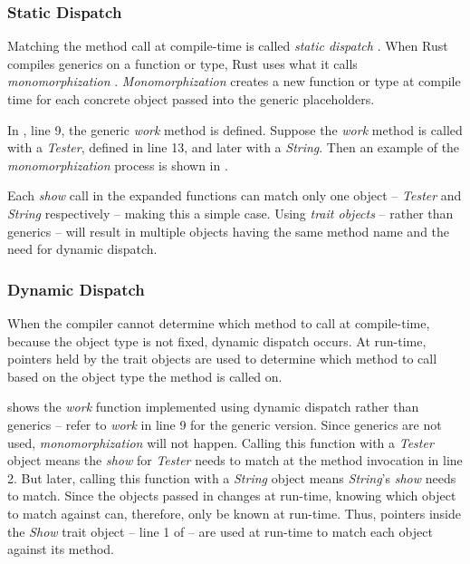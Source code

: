 \subsubsection{Static Dispatch}
Matching the method call at compile-time is called \textit{static dispatch} \cite{klabnik_2019_01, alexandrescu_01_01, abadi_12_01}.
When Rust compiles generics on a function or type, Rust uses what it calls \textit{monomorphization} \cite{klabnik_2019_01}.
\textit{Monomorphization} creates a new function or type at compile time for each concrete object passed into the generic placeholders.

In , line 9, the generic \textit{work} method is defined.
Suppose the \textit{work} method is called with a \textit{Tester}, defined in line 13, and later with a \textit{String}.
Then an example of the \textit{monomorphization} process is shown in .


Each \textit{show} call in the expanded functions can match only one object -- \textit{Tester} and \textit{String} respectively -- making this a simple case.
Using \textit{trait objects} -- rather than generics -- will result in multiple objects having the same method name and the need for dynamic dispatch.

\subsubsection{Dynamic Dispatch}
When the compiler cannot determine which method to call at compile-time, because the object type is not fixed, dynamic dispatch \cite{alexandrescu_01_01, klabnik_2019_01, abadi_12_01} occurs.
At run-time, pointers held by the trait objects are used to determine which method to call \cite{klabnik_2019_01} based on the object type the method is called on.

 shows the \textit{work} function implemented using dynamic dispatch rather than generics -- refer to \textit{work} in  line 9 for the generic version.
Since generics are not used, \textit{monomorphization} will not happen.
Calling this function with a \textit{Tester} object means the \textit{show} for \textit{Tester} needs to match at the method invocation in line 2.
But later, calling this function with a \textit{String} object means \textit{String}'s \textit{show} needs to match.
Since the objects passed in changes at run-time, knowing which object to match against can, therefore, only be known at run-time.
Thus, pointers inside the \textit{Show} trait object -- line 1 of  -- are used at run-time to match each object against its method.

